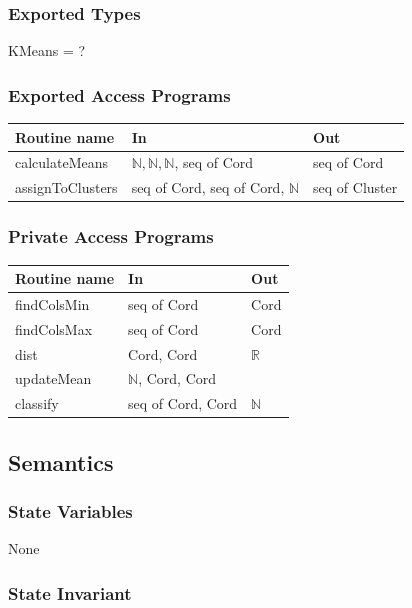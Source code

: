 \documentclass[12pt]{article}
\begin{document}
\subsubsection* {Exported Types}

KMeans = ?

\subsubsection* {Exported Access Programs}

\begin{tabular}{| l | l | l |}
\hline
\textbf{Routine name} & \textbf{In} & \textbf{Out}\\
\hline
calculateMeans & $\mathbb{N}, \mathbb{N}, \mathbb{N}$, seq of Cord & seq of Cord\\
\hline
assignToClusters & seq of Cord, seq of Cord, $\mathbb{N}$ & seq of Cluster\\
\hline
\end{tabular}

\subsubsection* {Private Access Programs}

\begin{tabular}{| l | l | l |}
\hline
\textbf{Routine name} & \textbf{In} & \textbf{Out}\\
\hline
findColsMin & seq of Cord & Cord\\
\hline
findColsMax & seq of Cord & Cord\\
\hline
dist & Cord, Cord & $\mathbb{R}$ \\
\hline
updateMean & $\mathbb{N}$, Cord, Cord & ~ \\
\hline
classify & seq of Cord, Cord & $\mathbb{N}$ \\
\hline
\end{tabular}

\subsection* {Semantics}

\subsubsection* {State Variables}

None

\subsubsection* {State Invariant}
\end{document}
